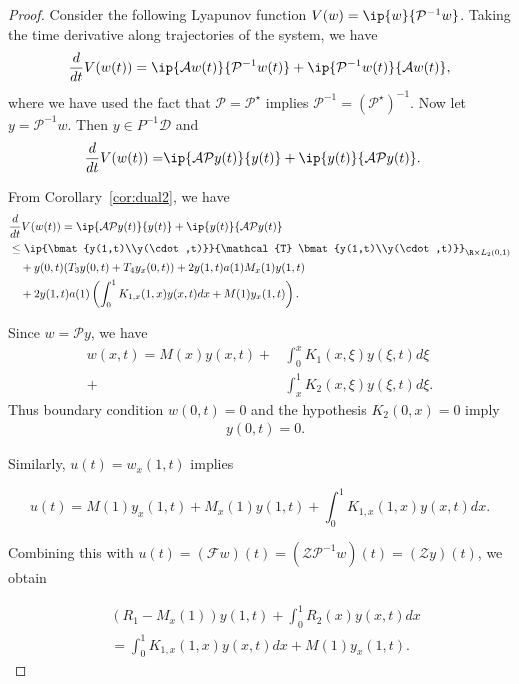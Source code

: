 \documentclass[9pt,journal,twocolumn]{IEEEtran}
\newcommand{\igzo}{\int_0^1}
\newcommand{\igzx}{\int_0^x}
\newcommand{\igxo}{\int_x^1}
\newcommand{\lt}{L_2(0,1)}
\begin{document}
\begin{proof}
Consider the following Lyapunov function $V(w)=\ip{w}{\mathcal{P}^{-1}w}$. Taking the time derivative along trajectories of the system, we have
\begin{align*}
\frac{d}{dt}V(w(t))=\ip{\mathcal{A}w(t)}{\mathcal{P}^{-1}w(t)}+\ip{\mathcal{P}^{-1}w(t)}{\mathcal{A}w(t)},
\end{align*} where we have used the fact that $\mathcal{P}=\mathcal{P}^\star$ implies $\mathcal{P}^{-1}= {\left(\mathcal{P}^\star\right)}^{-1}$.
Now let $y=\mathcal{P}^{-1}w$. Then $y \in P^{-1}\mathcal{D}$ and
\begin{align*}
\frac{d}{dt}V(w(t))=& \ip{\mathcal{A}\mathcal{P}y(t)}{y(t)}+\ip{y(t)}{\mathcal{A}\mathcal{P}y(t)}.
\end{align*}

From Corollary~\ref{cor:dual2}, we have
\begin{align}
&\frac{d}{dt}V(w(t))=\ip{\mathcal{A}\mathcal{P}y(t)}{y(t)}+\ip{y(t)}{\mathcal{A}\mathcal{P}y(t)} \nonumber \\
&\leq \ip{\bmat{y(1,t)\\y(\cdot,t)}} {\mathcal{T} \bmat{y(1,t)\\y(\cdot,t)}}_{\R \times \lt} \nonumber \\
&\quad +y(0,t)(T_3y(0,t)+T_4 y_x(0,t)) + 2y(1,t)a(1)M_x(1)y(1,t) \nonumber \\
&\label{eqn:synth_thm_1}\quad + 2y(1,t)a(1) \left(\igzo K_{1,x}(1,x)y(x,t)dx+M(1)y_x(1,t) \right).
\end{align}

Since $w=\mathcal{P}y$, we have
\begin{align*}
w(x,t)=M(x)y(x,t)+&\igzx K_1(x,\xi)y(\xi,t) d\xi \\
+ &\igxo K_2(x,\xi)y(\xi,t) d\xi.
\end{align*}
Thus boundary condition $w(0,t)=0$ and the hypothesis $K_2(0,x)=0$ imply
\begin{align}
&\label{eqn:synth_left_cond} y(0,t)=0.
\end{align}

Similarly, $u(t)=w_x(1,t)$ implies

\[
u(t)=M(1)y_x(1,t)+M_x(1)y(1,t)+\igzo K_{1,x}(1,x)y(x,t)dx.
\]

Combining this with $u(t)=(\mathcal{F}w)(t)=(\mathcal{Z}\mathcal{P}^{-1}w)(t)=(\mathcal{Z}y)(t)$, we obtain

\begin{align}
&(R_1-M_x(1))y(1,t) + \igzo R_2(x)y(x,t)dx  \nonumber \\
&\label{eqn:synth_right_cond}=\igzo K_{1,x}(1,x)y(x,t)dx+M(1)y_x(1,t).
\end{align}


\end{proof}
\end{document}
